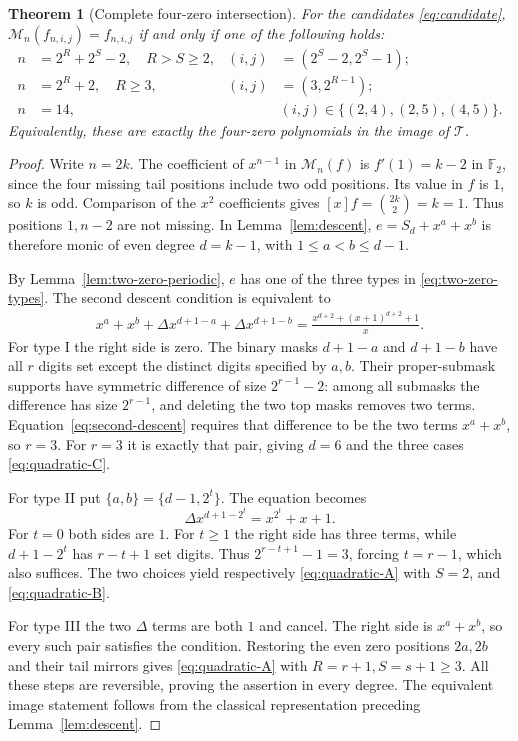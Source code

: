 \documentclass[11pt]{article}
\newtheorem{theorem}[proposition]{Theorem}
\theoremstyle{definition}
\theoremstyle{remark}
\begin{document}
\begin{theorem}[Complete four-zero intersection]\label{thm:quadratic}
For the candidates \eqref{eq:candidate},
$\mathcal M_n(f_{n,i,j})=f_{n,i,j}$ if and only if one of the
following holds:
\begin{align}
 n&=2^R+2^S-2,\quad R>S\ge2,&
 (i,j)&=(2^S-2,2^S-1);\label{eq:quadratic-A}\\
 n&=2^R+2,\quad R\ge3,&
 (i,j)&=(3,2^{R-1});\label{eq:quadratic-B}\\
 n&=14,&&
 (i,j)\in\{(2,4),(2,5),(4,5)\}.\label{eq:quadratic-C}
\end{align}
Equivalently, these are exactly the four-zero polynomials in the
image of $\mathcal T$.
\end{theorem}
\begin{proof}
Write $n=2k$. The coefficient of $x^{n-1}$ in
$\mathcal M_n(f)$ is $f'(1)=k-2$ in $\mathbb F_2$, since the
four missing tail positions include two odd positions.
Its value in $f$ is $1$, so $k$ is odd. Comparison of the
$x^2$ coefficients gives $[x]f=\binom{2k}{2}=k=1$.
Thus positions $1,n-2$ are not missing. In Lemma~\ref{lem:descent},
$e=S_d+x^a+x^b$ is therefore monic of even degree $d=k-1$,
with $1\le a<b\le d-1$.

By Lemma~\ref{lem:two-zero-periodic}, $e$ has one of the three types
in \eqref{eq:two-zero-types}. The second descent condition is
equivalent to
\begin{equation}\label{eq:second-descent}
\begin{split}
 x^a+x^b+\Delta x^{d+1-a}+\Delta x^{d+1-b}
 =\frac{x^{d+2}+(x+1)^{d+2}+1}{x}.
\end{split}
\end{equation}
For type I the right side is zero. The binary masks $d+1-a$ and
$d+1-b$ have all $r$ digits set except the distinct digits specified
by $a,b$. Their proper-submask supports have symmetric difference
of size $2^{r-1}-2$: among all submasks the difference has size
$2^{r-1}$, and deleting the two top masks removes two terms.
Equation~\eqref{eq:second-descent} requires that difference to be
the two terms $x^a+x^b$, so $r=3$. For $r=3$ it is exactly that
pair, giving $d=6$ and the three cases \eqref{eq:quadratic-C}.

For type II put $\{a,b\}=\{d-1,2^t\}$. The equation becomes
\[
 \Delta x^{d+1-2^t}=x^{2^t}+x+1.
\]
For $t=0$ both sides are $1$. For $t\ge1$ the right side has
three terms, while $d+1-2^t$ has $r-t+1$ set digits. Thus
$2^{r-t+1}-1=3$, forcing $t=r-1$, which also suffices.
The two choices yield respectively \eqref{eq:quadratic-A} with
$S=2$, and \eqref{eq:quadratic-B}.

For type III the two $\Delta$ terms are both $1$ and cancel.
The right side is $x^a+x^b$, so every such pair satisfies the
condition. Restoring the even zero positions $2a,2b$ and their
tail mirrors gives \eqref{eq:quadratic-A} with $R=r+1,S=s+1\ge3$.
All these steps are reversible, proving the assertion in every degree.
The equivalent image statement follows from the classical
representation preceding Lemma~\ref{lem:descent}.
\end{proof}
\end{document}
